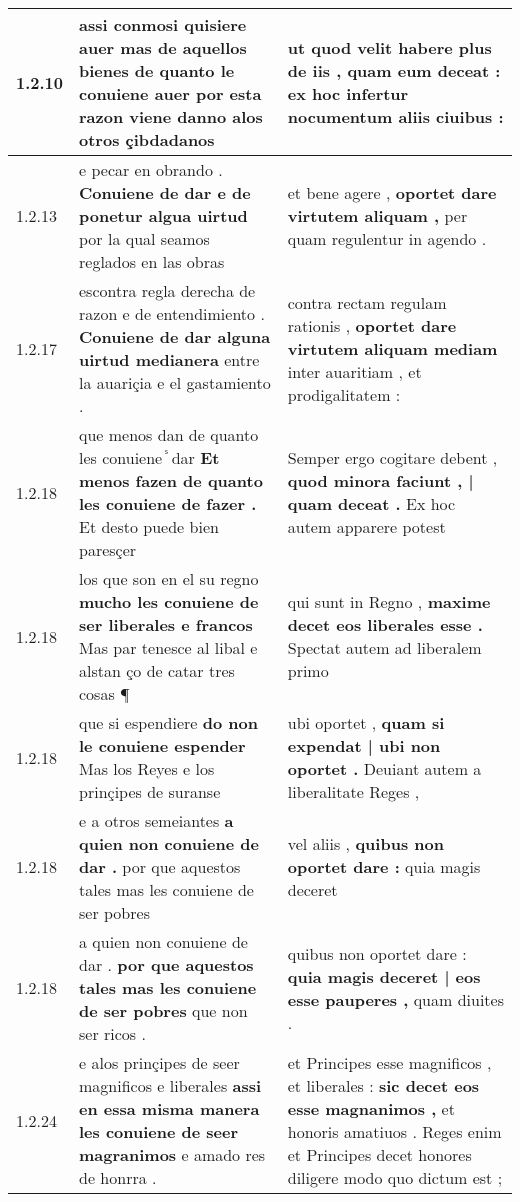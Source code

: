 \begin{tabular}{|p{1cm}|p{6.5cm}|p{6.5cm}|}
1.2.10 & assi conmosi quisiere auer mas de aquellos bienes \textbf{ de quanto le conuiene auer } por esta razon viene danno alos otros çibdadanos & ut quod velit habere plus de iis , \textbf{ quam eum deceat : } ex hoc infertur nocumentum aliis ciuibus : \\\hline
1.2.13 & e pecar en obrando . \textbf{ Conuiene de dar e de ponetur algua uirtud } por la qual seamos reglados en las obras & et bene agere , \textbf{ oportet dare virtutem aliquam , } per quam regulentur in agendo . \\\hline
1.2.17 & escontra regla derecha de razon e de entendimiento . \textbf{ Conuiene de dar alguna uirtud medianera } entre la auariçia e el gastamiento . & contra rectam regulam rationis , \textbf{ oportet dare virtutem aliquam mediam } inter auaritiam , et prodigalitatem : \\\hline
1.2.18 & que menos dan de quanto les conuiene ᷤ dar \textbf{ Et menos fazen de quanto les conuiene de fazer . } Et desto puede bien paresçer & Semper ergo cogitare debent , \textbf{ quod minora faciunt , | quam deceat . } Ex hoc autem apparere potest \\\hline
1.2.18 & los que son en el su regno \textbf{ mucho les conuiene de ser liberales e francos } Mas par tenesce al libal e alstan ço de catar tres cosas ¶ & qui sunt in Regno , \textbf{ maxime decet eos liberales esse . } Spectat autem ad liberalem primo \\\hline
1.2.18 & que si espendiere \textbf{ do non le conuiene espender } Mas los Reyes e los prinçipes de suranse & ubi oportet , \textbf{ quam si expendat | ubi non oportet . } Deuiant autem a liberalitate Reges , \\\hline
1.2.18 & e a otros semeiantes \textbf{ a quien non conuiene de dar . } por que aquestos tales mas les conuiene de ser pobres & vel aliis , \textbf{ quibus non oportet dare : } quia magis deceret \\\hline
1.2.18 & a quien non conuiene de dar . \textbf{ por que aquestos tales mas les conuiene de ser pobres } que non ser ricos . & quibus non oportet dare : \textbf{ quia magis deceret | eos esse pauperes , } quam diuites . \\\hline
1.2.24 & e alos prinçipes de seer magnificos e liberales \textbf{ assi en essa misma manera les conuiene de seer magranimos } e amado res de honrra . & et Principes esse magnificos , et liberales : \textbf{ sic decet eos esse magnanimos , } et honoris amatiuos . Reges enim et Principes decet honores diligere modo quo dictum est ; \\\hline

\end{tabular}
